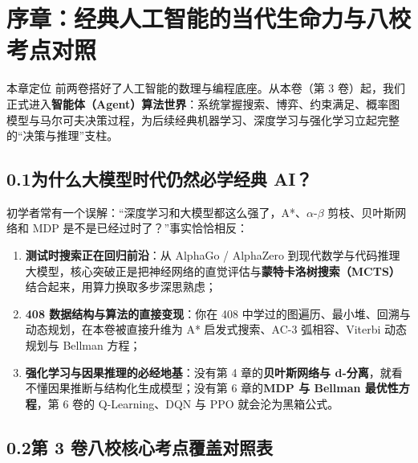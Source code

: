 \chapter*{序章：经典人工智能的当代生命力与八校考点对照}

\begin{chapIntro}{本章定位}
前两卷搭好了人工智能的数理与编程底座。从本卷（第 3 卷）起，我们正式进入\textbf{智能体（Agent）算法世界}：系统掌握搜索、博弈、约束满足、概率图模型与马尔可夫决策过程，为后续经典机器学习、深度学习与强化学习立起完整的“决策与推理”支柱。
\end{chapIntro}

\section*{0.1\quad 为什么大模型时代仍然必学经典 AI？}

初学者常有一个误解：“深度学习和大模型都这么强了，A*、$\alpha$-$\beta$ 剪枝、贝叶斯网络和 MDP 是不是已经过时了？”事实恰恰相反：
\begin{enumerate}
  \item \textbf{测试时搜索正在回归前沿}：从 AlphaGo / AlphaZero 到现代数学与代码推理大模型，核心突破正是把神经网络的直觉评估与\textbf{蒙特卡洛树搜索（MCTS）}结合起来，用算力换取多步深思熟虑；
  \item \textbf{408 数据结构与算法的直接变现}：你在 408 中学过的图遍历、最小堆、回溯与动态规划，在本卷被直接升维为 A* 启发式搜索、AC-3 弧相容、Viterbi 动态规划与 Bellman 方程；
  \item \textbf{强化学习与因果推理的必经地基}：没有第 4 章的\textbf{贝叶斯网络与 d-分离}，就看不懂因果推断与结构化生成模型；没有第 6 章的\textbf{MDP 与 Bellman 最优性方程}，第 6 卷的 Q-Learning、DQN 与 PPO 就会沦为黑箱公式。
\end{enumerate}

\section*{0.2\quad 第 3 卷八校核心考点覆盖对照表}

